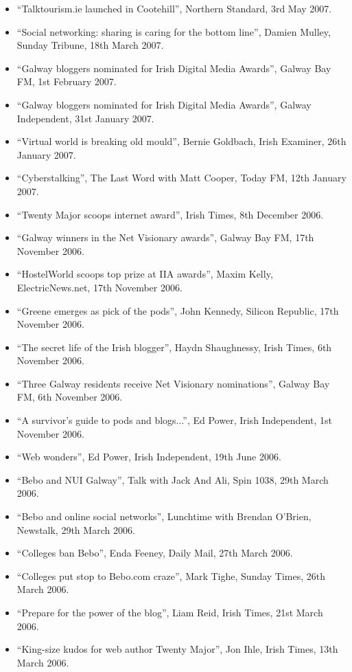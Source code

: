 \documentclass[10pt,a4paper]{res} %
\begin{document}
\begin{resume}
{\begin{itemize}
\item ``Talktourism.ie launched in Cootehill'', Northern Standard, 3rd May 2007.
\item ``Social networking: sharing is caring for the bottom line'', Damien Mulley, Sunday Tribune, 18th March 2007.
\item ``Galway bloggers nominated for Irish Digital Media Awards'', Galway Bay FM, 1st February 2007.
\item ``Galway bloggers nominated for Irish Digital Media Awards'', Galway Independent, 31st January 2007.
\item ``Virtual world is breaking old mould'', Bernie Goldbach, Irish Examiner, 26th January 2007.
\item ``Cyberstalking'', The Last Word with Matt Cooper, Today FM, 12th January 2007.
\item ``Twenty Major scoops internet award'', Irish Times, 8th December 2006.
\item ``Galway winners in the Net Visionary awards'', Galway Bay FM, 17th November 2006.
\item ``HostelWorld scoops top prize at IIA awards'', Maxim Kelly, ElectricNews.net, 17th November 2006.
\item ``Greene emerges as pick of the pods'', John Kennedy, Silicon Republic, 17th November 2006.
\item ``The secret life of the Irish blogger'', Haydn Shaughnessy, Irish Times, 6th November 2006.
\item ``Three Galway residents receive Net Visionary nominations'', Galway Bay FM, 6th November 2006.
\item ``A survivor's guide to pods and blogs...'', Ed Power, Irish Independent, 1st November 2006.
\item ``Web wonders'', Ed Power, Irish Independent, 19th June 2006.
\item ``Bebo and NUI Galway'', Talk with Jack And Ali, Spin 1038, 29th March 2006.
\item ``Bebo and online social networks'', Lunchtime with Brendan O'Brien, Newstalk, 29th March 2006.
\item ``Colleges ban Bebo'', Enda Feeney, Daily Mail, 27th March 2006.
\item ``Colleges put stop to Bebo.com craze'', Mark Tighe, Sunday Times, 26th March 2006.
\item ``Prepare for the power of the blog'', Liam Reid, Irish Times, 21st March 2006.
\item ``King-size kudos for web author Twenty Major'', Jon Ihle, Irish Times, 13th March 2006.

\end{itemize}}
\end{resume}
\end{document}
